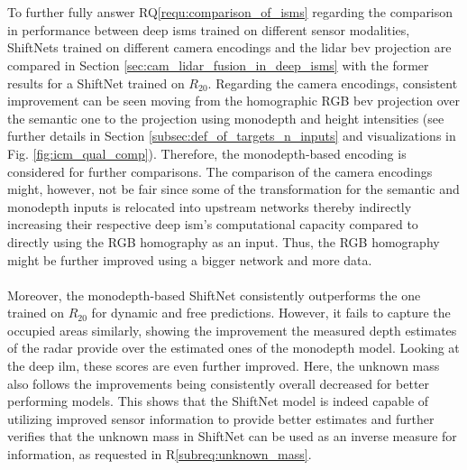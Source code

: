 \\\\
To further fully answer RQ\ref{requ:comparison_of_isms} regarding the comparison in performance between deep \gls{ism}s trained on different sensor modalities, ShiftNets trained on different camera encodings and the lidar \gls{bev} projection are compared in Section \ref{sec:cam_lidar_fusion_in_deep_isms} with the former results for a ShiftNet trained on $R_{20}$. Regarding the camera encodings, consistent improvement can be seen moving from the homographic RGB \gls{bev} projection over the semantic one to the projection using \gls{monodepth} and height intensities (see further details in Section \ref{subsec:def_of_targets_n_inputs} and visualizations in Fig. \ref{fig:icm_qual_comp}). Therefore, the \gls{monodepth}-based encoding is considered for further comparisons. The comparison of the camera encodings might, however, not be fair since some of the transformation for the semantic and \gls{monodepth} inputs is relocated into upstream networks thereby indirectly increasing their respective deep \gls{ism}'s computational capacity compared to directly using the RGB homography as an input. Thus, the RGB homography might be further improved using a bigger network and more data.
\\\\
Moreover, the \gls{monodepth}-based ShiftNet consistently outperforms the one trained on $R_{20}$ for dynamic and free predictions. However, it fails to capture the occupied areas similarly, showing the improvement the measured depth estimates of the radar provide over the estimated ones of the \gls{monodepth} model. Looking at the deep \gls{ilm}, these scores are even further improved. Here, the unknown mass also follows the improvements being consistently overall decreased for better performing models. This shows that the ShiftNet model is indeed capable of utilizing improved sensor information to provide better estimates and further verifies that the unknown mass in ShiftNet can be used as an inverse measure for information, as requested in R\ref{subreq:unknown_mass}.
\\\\ 
